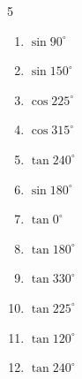 \begin{multicols}{5}
\begin{enumerate}

  \item $\displaystyle \sin{90^\circ}$

        \phantom{$\displaystyle =1$}

  \item $\displaystyle \sin{150^\circ}$


  \item $\displaystyle \cos{225^\circ}$


  \item $\displaystyle \cos{315^\circ}$


  \item $\displaystyle \tan{240^\circ}$


  \item $\displaystyle \sin{180^\circ}$

        \phantom{$\displaystyle =0$}

  \item $\displaystyle \tan{0^\circ}$

        \phantom{$\displaystyle =0$}

  \item $\displaystyle \tan{180^\circ}$

        \phantom{$\displaystyle =0$}

  \item $\displaystyle \tan{330^\circ}$


  \item $\displaystyle \tan{225^\circ}$

        \phantom{$\displaystyle =1$}

  \item $\displaystyle \tan{120^\circ}$


\columnbreak %

  \item $\displaystyle \tan{240^\circ}$



\end{enumerate}
\end{multicols}
